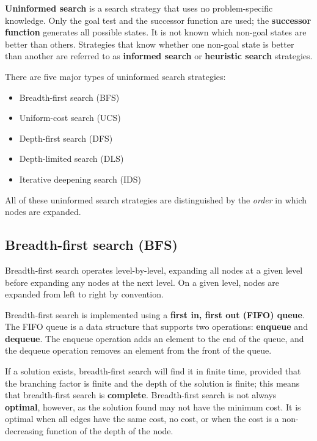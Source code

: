 
\begin{definition}
    \textbf{Uninformed search} is a search strategy that uses no problem-specific knowledge. Only the goal test and the successor function are used; the \textbf{successor function} generates all possible states. It is not known which non-goal states are better than others. Strategies that know whether one non-goal state is better than another are referred to as \textbf{informed search} or \textbf{heuristic search} strategies.
\end{definition}

There are five major types of uninformed search strategies:
\begin{itemize}
    \item Breadth-first search (BFS)
    \item Uniform-cost search (UCS)
    \item Depth-first search (DFS)
    \item Depth-limited search (DLS)
    \item Iterative deepening search (IDS)
\end{itemize}
All of these uninformed search strategies are distinguished by the \emph{order} in which nodes are expanded.

\subsection{Breadth-first search (BFS)}
\label{sub_sec:breadth_first_search}

Breadth-first search operates level-by-level, expanding all nodes at a given level before expanding any nodes at the next level. On a given level, nodes are expanded from left to right by convention.

\begin{definition}
    Breadth-first search is implemented using a \textbf{first in, first out (FIFO) queue}. The FIFO queue is a data structure that supports two operations: \textbf{enqueue} and \textbf{dequeue}. The enqueue operation adds an element to the end of the queue, and the dequeue operation removes an element from the front of the queue.
\end{definition}

\begin{definition}
    If a solution exists, breadth-first search will find it in finite time, provided that the branching factor is finite and the depth of the solution is finite; this means that breadth-first search is \textbf{complete}. Breadth-first search is not always \textbf{optimal}, however, as the solution found may not have the minimum cost. It is optimal when all edges have the same cost, no cost, or when the cost is a non-decreasing function of the depth of the node.
\end{definition}

